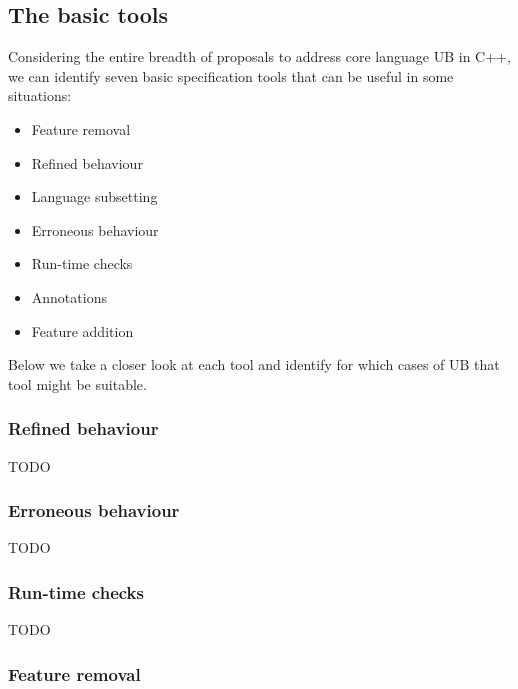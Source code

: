 \subsection{The basic tools}

Considering the entire breadth of proposals to address core language UB in C++, we can identify seven basic specification tools that can be useful in some situations:

\begin{itemize}
\item Feature removal
\item Refined behaviour
\item Language subsetting
\item Erroneous behaviour
\item Run-time checks
\item Annotations
\item Feature addition
\end{itemize}

Below we take a closer look at each tool and identify for which cases of UB that tool might be suitable.



\subsubsection{Refined behaviour}
\label{refined}

TODO


\subsubsection{Erroneous behaviour}
\label{erroneous}

TODO


\subsubsection{Run-time checks}
\label{checks}

TODO

\subsubsection{Feature removal}
\label{removal}

